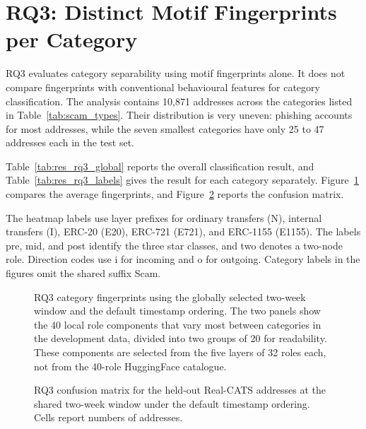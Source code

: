 \section{RQ3: Distinct Motif Fingerprints per Category}

RQ3 evaluates category separability using motif fingerprints alone. It does
not compare fingerprints with conventional behavioural features for category
classification. The analysis contains 10{,}871 addresses across the categories listed in
Table~\ref{tab:scam_types}. Their distribution is very uneven: phishing accounts
for most addresses, while the seven smallest categories have only 25 to 47
addresses each in the test set.

Table~\ref{tab:res_rq3_global} reports the overall classification result, and
Table~\ref{tab:res_rq3_labels} gives the result for each category separately.
Figure~\ref{fig:res_rq3} compares the average fingerprints, and
Figure~\ref{fig:res_rq3_confusion} reports the confusion matrix.

The heatmap labels use layer prefixes for ordinary transfers (N), internal
transfers (I), ERC-20 (E20), ERC-721 (E721), and ERC-1155 (E1155).
The labels pre, mid, and post identify the three star classes, and two denotes
a two-node role. Direction codes use i for incoming and o for outgoing.
Category labels in the figures omit the shared suffix Scam.

\begin{figure}[p]
  \centering
  \caption{RQ3 category fingerprints using the globally selected two-week
  window and the default timestamp ordering. The two panels show the 40 local
  role components that vary most between categories in the development data,
  divided into two groups of 20 for readability. These components are selected
  from the five layers of 32 roles each, not from the 40-role HuggingFace
  catalogue.}
  \label{fig:res_rq3}
\end{figure}

\begin{figure}[p]
  \centering
  \caption{RQ3 confusion matrix for the held-out Real-CATS addresses at the
  shared two-week window under the default timestamp ordering. Cells report
  numbers of addresses.}
  \label{fig:res_rq3_confusion}
\end{figure}


